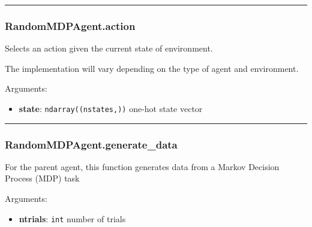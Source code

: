 \begin{center}\rule{0.5\linewidth}{\linethickness}\end{center}

\subsubsection{RandomMDPAgent.action}\label{randommdpagent.action}

\begin{Shaded}
\begin{Highlighting}[]
\end{Highlighting}
\end{Shaded}

Selects an action given the current state of environment.

The implementation will vary depending on the type of agent and
environment.

Arguments:

\begin{itemize}
\tightlist
\item
  \textbf{state}: \texttt{ndarray((nstates,))} one-hot state vector
\end{itemize}

\begin{center}\rule{0.5\linewidth}{\linethickness}\end{center}

\subsubsection{RandomMDPAgent.generate\_data}\label{randommdpagent.generate_data}

\begin{Shaded}
\begin{Highlighting}[]
\end{Highlighting}
\end{Shaded}

For the parent agent, this function generates data from a Markov
Decision Process (MDP) task

Arguments:

\begin{itemize}
\tightlist
\item
  \textbf{ntrials}: \texttt{int} number of trials
\end{itemize}

